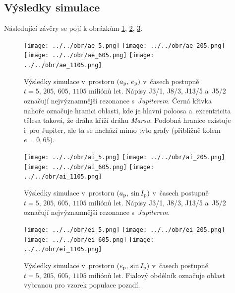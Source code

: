 \documentclass[a4paper, 12pt]{article}
\begin{document}
\subsection{Výsledky simulace}

Následující závěry se pojí k obrázkům \ref{fig:vysledky1}, \ref{fig:vysledky2}, \ref{fig:vysledky3}.

\begin{figure} 
	\centering
	\texttt{[image: ../../obr/ae\_5.png]}
	\texttt{[image: ../../obr/ae\_205.png]}\\
	\texttt{[image: ../../obr/ae\_605.png]}
	\texttt{[image: ../../obr/ae\_1105.png]}
		\caption{Výsledky simulace v~prostoru $(a_{\rm p},\,e_{\rm p})$ v~časech postupně $t=5,\,205,\,605,\,1105$ miliónů let. Nápisy J3/1, J8/3, J13/5 a~J5/2 označují nejvýznamnější rezonance s~\textit{Jupiterem}. Černá křivka nahoře označuje hranici oblasti, kde je hlavní poloosa a~excentricita tělesa taková, že dráha kříží dráhu \textit{Marsu}. Podobná hranice existuje i~pro Jupiter, ale ta se nachází mimo tyto grafy (přibližně kolem $e=0,65$).} \label{fig:vysledky1}
\end{figure}
\begin{figure} 
	\texttt{[image: ../../obr/ai\_5.png]}
	\texttt{[image: ../../obr/ai\_205.png]}\\
	\texttt{[image: ../../obr/ai\_605.png]}
	\texttt{[image: ../../obr/ai\_1105.png]}
		\caption{Výsledky simulace v~prostoru $(a_{\rm p},\,\sin I_{\rm p})$ v~časech postupně $t=5,\,205,\,605,\,1105$ miliónů let. Nápisy J3/1, J8/3, J13/5 a~J5/2 označují nejvýznamnější rezonance s~\textit{Jupiterem}.} \label{fig:vysledky2}
\end{figure}
\begin{figure}
	\texttt{[image: ../../obr/ei\_5.png]}
	\texttt{[image: ../../obr/ei\_205.png]}\\
	\texttt{[image: ../../obr/ei\_605.png]}
	\texttt{[image: ../../obr/ei\_1105.png]}
		\caption{Výsledky simulace v~prostoru $(e_{\rm p},\,\sin I_{\rm p})$ v~časech postupně $t=5,\,205,\,605,\,1105$ miliónů let. Fialový obdélník označuje oblast vybranou pro vzorek populace pozadí.} \label{fig:vysledky3}
\end{figure}
\end{document}
